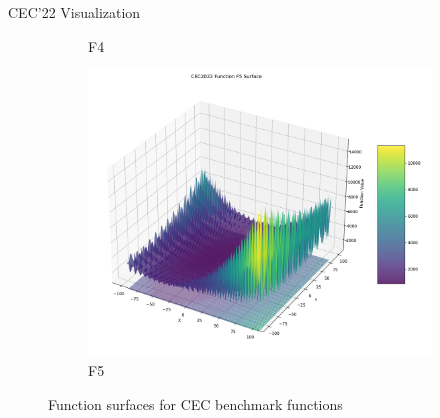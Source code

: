 \documentclass[aspectratio=169]{beamer}
\begin{document}
\begin{frame}{CEC'22 Visualization}
\begin{figure}
\begin{subfigure}[b]{0.19\textwidth}
            \caption*{F4}
        \end{subfigure}
        \hfill
        \begin{subfigure}[b]{0.19\textwidth}
            \includegraphics[width=\textwidth]{../plots/cec_bench/function_surface_f5.png}
            \caption*{F5}
        \end{subfigure}
        \vspace{-1ex}
        \caption*{\scriptsize Function surfaces for CEC benchmark functions}
    \end{figure}
\end{frame}
\end{document}
